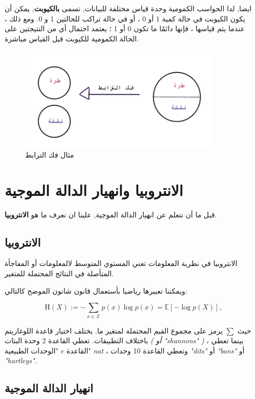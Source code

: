 \documentclass[a4paper,12pt,openright,twoside]{book}
\begin{document}
ايضا, لدا الحواسب الكمومية وحدة قياس مختلفة للبيانات, تسمى 
\textbf{بالكيوبت\dash {}}.
يمكن أن يكون الكيوبت في حالة كمية 1 أو 0 ، أو في حالة تراكب للحالتين 1 و 0. ومع ذلك ، عندما يتم قياسها ، فإنها دائمًا ما تكون 0 أو 1 ؛ يعتمد احتمال أي من النتيجتين على الحالة الكمومية للكيوبت قبل القياس مباشرة.


\begin{figure}
	\centering
	\includegraphics[width=\textwidth, height=5cm]{decoherence.png}
	\caption{مثال فك الترابط}
	\label{fig:dec}
\end{figure} \newpage


\section{الانتروبيا وانهيار الدالة الموجية}

قبل ما أن نتعلم عن انهيار الدالة الموجية, علينا ان نعرف ما هو
\textbf{الانتروبيا\dash {}}.

\subsection{الانتروبيا}

الانتروبيا في نظرية المعلومات تعني المستوي المتوسط لالمعلومات أو المفاجأة المتأصلة في النتائج المحتملة للمتغير.

ويمكننا تعبيرها رياضيا بأستعمال قانون شانون الموضح كالتالي:

$$
{\displaystyle \mathrm{H}(X) := -\sum _{x\in {\mathcal {X}}}p(x)\log p(x)= \mathbb{E} [-\log p(X)],}
$$

حيث
$ \sum $
يرمز على مجموع القيم المحتملة لمتغير ما.
يختلف اختيار قاعدة اللوغاريتم باختلاف التطبيقات. تعطي القاعدة 2 وحدة البتات 
\emph{( أو "shannons" )} ، بينما تعطي القاعدة $ e $ "الوحدات الطبيعية" \emph{nat} ، وتعطي القاعدة 10 وحدات \emph{"dits"} أو \emph{"bans"} أو \emph{"hartleys"}.

\subsection{انهيار الدالة الموجية}
\end{document}
